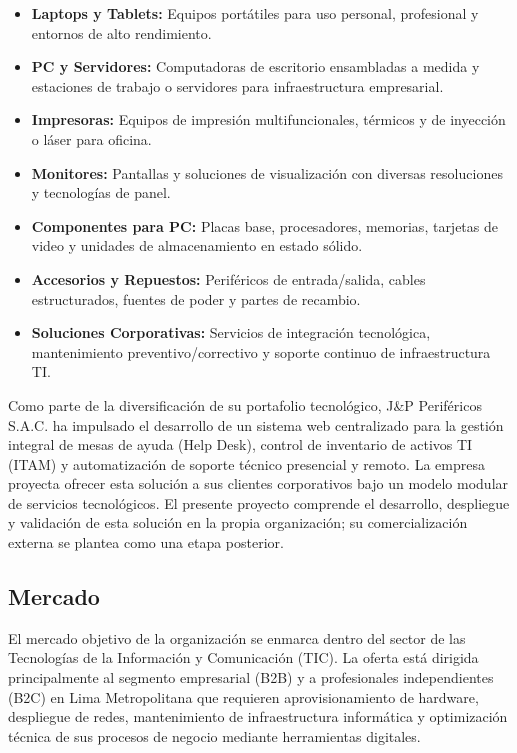 \begin{itemize}
    \item \textbf{Laptops y Tablets:} Equipos portátiles para uso personal, profesional y entornos de alto rendimiento.
    \item \textbf{PC y Servidores:} Computadoras de escritorio ensambladas a medida y estaciones de trabajo o servidores para infraestructura empresarial.
    \item \textbf{Impresoras:} Equipos de impresión multifuncionales, térmicos y de inyección o láser para oficina.
    \item \textbf{Monitores:} Pantallas y soluciones de visualización con diversas resoluciones y tecnologías de panel.
    \item \textbf{Componentes para PC:} Placas base, procesadores, memorias, tarjetas de video y unidades de almacenamiento en estado sólido.
    \item \textbf{Accesorios y Repuestos:} Periféricos de entrada/salida, cables estructurados, fuentes de poder y partes de recambio.
    \item \textbf{Soluciones Corporativas:} Servicios de integración tecnológica, mantenimiento preventivo/correctivo y soporte continuo de infraestructura TI.
\end{itemize}

Como parte de la diversificación de su portafolio tecnológico, J\&P Periféricos S.A.C. ha impulsado el desarrollo de un sistema web centralizado para la gestión integral de mesas de ayuda (Help Desk), control de inventario de activos TI (ITAM) y automatización de soporte técnico presencial y remoto. La empresa proyecta ofrecer esta solución a sus clientes corporativos bajo un modelo modular de servicios tecnológicos. El presente proyecto comprende el desarrollo, despliegue y validación de esta solución en la propia organización; su comercialización externa se plantea como una etapa posterior.

\subsection{Mercado}
El mercado objetivo de la organización se enmarca dentro del sector de las Tecnologías de la Información y Comunicación (TIC). La oferta está dirigida principalmente al segmento empresarial (B2B) y a profesionales independientes (B2C) en Lima Metropolitana que requieren aprovisionamiento de hardware, despliegue de redes, mantenimiento de infraestructura informática y optimización técnica de sus procesos de negocio mediante herramientas digitales.

